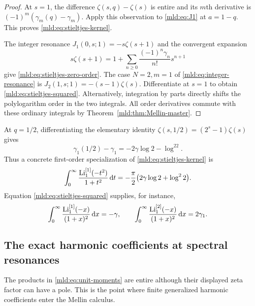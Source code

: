\begin{proof}
At $s=1$, the difference $\zeta(s,q)-\zeta(s)$ is entire and its $m$th derivative is $(-1)^m(\gamma_m(q)-\gamma_m)$. Apply this observation to \eqref{mld:eq:J1} at $a=1-q$. This proves \eqref{mld:eq:stieltjes-kernel}.

The integer resonance $J_1(0,s;1)=-s\zeta(s+1)$ and the convergent expansion
\begin{equation}\label{mld:eq:F-stieltjes}
 s\zeta(s+1)=1+
       \sum_{n\ge0}\frac{(-1)^n\gamma_n}{n!}s^{n+1}
\end{equation}
give \eqref{mld:eq:stieltjes-zero-order}. The case $N=2,m=1$ of
\eqref{mld:eq:integer-resonance} is $J_2(1,s;1)=-(s-1)\zeta(s)$.
Differentiate at $s=1$ to obtain \eqref{mld:eq:stieltjes-squared}. Alternatively, integration by parts directly shifts the polylogarithm order in the two integrals. All order derivatives commute with these ordinary integrals by Theorem~\ref{mld:thm:Mellin-master}.
\end{proof}

At $q=1/2$, differentiating the elementary identity
$\zeta(s,1/2)=(2^s-1)\zeta(s)$ gives
\[
 \gamma_1(1/2)-\gamma_1=-2\gamma\log2-\log^22.
\]
Thus a concrete first-order specialization of
\eqref{mld:eq:stieltjes-kernel} is
\begin{equation}\label{mld:eq:stieltjes-half-integral}
 \int_0^\infty\frac{\operatorname{Li}_1^{[1]}(-t^2)}{1+t^2}\,\mathrm{d} t
       =-\frac\pi2\big(2\gamma\log2+\log^22\big).
\end{equation}
Equation \eqref{mld:eq:stieltjes-squared} supplies, for instance,
\[
 \int_0^\infty\frac{\operatorname{Li}_1^{[1]}(-x)}{(1+x)^2}\,\mathrm{d} x=-\gamma,
 \qquad
 \int_0^\infty\frac{\operatorname{Li}_1^{[2]}(-x)}{(1+x)^2}\,\mathrm{d} x=2\gamma_1.
\]

\subsection{The exact harmonic coefficients at spectral resonances}

The products in \eqref{mld:eq:unit-moments} are entire although their displayed zeta factor can have a pole. This is the point where finite generalized harmonic coefficients enter the Mellin calculus.


